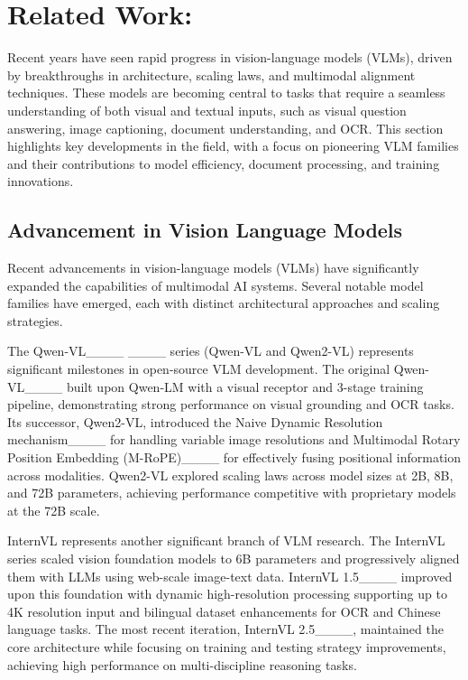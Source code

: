 \section{Related Work: }
Recent years have seen rapid progress in vision-language models (VLMs), driven by breakthroughs in architecture, scaling laws, and multimodal alignment techniques. These models are becoming central to tasks that require a seamless understanding of both visual and textual inputs, such as visual question answering, image captioning, document understanding, and OCR. This section highlights key developments in the field, with a focus on pioneering VLM families and their contributions to model efficiency, document processing, and training innovations. 

\subsection{Advancement in Vision Language Models}
Recent advancements in vision-language models (VLMs) have significantly expanded the capabilities of multimodal AI systems. Several notable model families have emerged, each with distinct architectural approaches and scaling strategies. 

The Qwen-VL____ ____ series (Qwen-VL and Qwen2-VL) represents significant milestones in open-source VLM development. The original Qwen-VL____ built upon Qwen-LM with a visual receptor and 3-stage training pipeline, demonstrating strong performance on visual grounding and OCR tasks. Its successor, Qwen2-VL, introduced the Naive Dynamic Resolution mechanism____ for handling variable image resolutions and Multimodal Rotary Position Embedding (M-RoPE)____ for effectively fusing positional information across modalities. Qwen2-VL explored scaling laws across model sizes at 2B, 8B, and 72B parameters, achieving performance competitive with proprietary models at the 72B scale. 

InternVL represents another significant branch of VLM research. The InternVL series scaled vision foundation models to 6B parameters and progressively aligned them with LLMs using web-scale image-text data. InternVL 1.5____ improved upon this foundation with dynamic high-resolution processing supporting up to 4K resolution input and bilingual dataset enhancements for OCR and Chinese language tasks. The most recent iteration, InternVL 2.5____, maintained the core architecture while focusing on training and testing strategy improvements, achieving high performance on multi-discipline reasoning tasks. 

